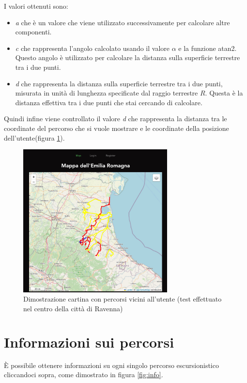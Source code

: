 I valori ottenuti sono:
\begin{itemize}
    \item \emph{a} che è un valore che viene utilizzato successivamente per calcolare altre componenti.

    \item \emph{c} che rappresenta l'angolo calcolato usando il valore $\alpha$ e la funzione atan2. Questo angolo è utilizzato per calcolare la distanza sulla superficie terrestre tra i due punti.

    \item \emph{d} che rappresenta la distanza sulla superficie terrestre tra i due punti, misurata in unità di lunghezza specificate dal raggio terrestre $R$. Questa è la distanza effettiva tra i due punti che stai cercando di calcolare.
\end{itemize}

Quindi infine viene controllato il valore \emph{d} che rappresenta la distanza tra le coordinate del percorso che si vuole mostrare e le coordinate della posizione dell'utente(figura \ref{fig:vicina}).

\begin{figure}[h]
\begin{center}                      
\includegraphics[width=0.7\textwidth]{images/Mappa_vicina.jpg}
\caption[Dimostrazione funzionamento mappa]{Dimostrazione cartina con percorsi vicini all'utente (test effettuato nel centro della città di Ravenna)}\label{fig:vicina}
\end{center}
\end{figure}


\section{Informazioni sui percorsi}
È possibile ottenere informazioni su ogni singolo percorso escursionistico cliccandoci sopra, come dimostrato in figura \ref{fig:info}.

